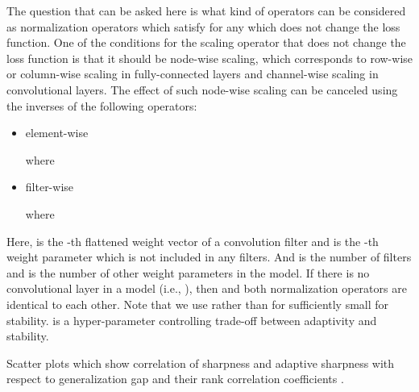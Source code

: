 \documentclass{article}
\begin{document}
The question that can be asked here is what kind of operators  can be considered as normalization operators which satisfy  for any  which does not change the loss function. One of the conditions for the scaling operator  that does not change the loss function is that it should be node-wise scaling, which corresponds to row-wise or column-wise scaling in fully-connected layers and channel-wise scaling in convolutional layers. The effect of such node-wise scaling can be canceled using the inverses of the following operators:
\begin{itemize}
	\item element-wise
	
	where
    
\item filter-wise
	
	where
    
\end{itemize}

Here,  is the -th flattened weight vector of a convolution filter and  is the -th weight parameter which is not included in any filters. And  is the number of filters and  is the number of other weight parameters in the model. If there is no convolutional layer in a model (i.e., ), then  and both normalization operators are identical to each other.
Note that we use  rather than  for sufficiently small  for stability.
 is a hyper-parameter controlling trade-off between adaptivity and stability. 

\beginfigure
\centering
\ificml
{}
\else
{}
\fi
\caption{Scatter plots which show correlation of sharpness and adaptive sharpness with respect to generalization gap and their rank correlation coefficients .}\label{scatter}
\jmkendfigure
\end{document}
